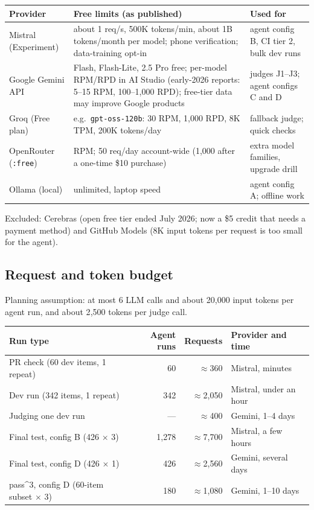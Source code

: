 \documentclass[11pt,a4paper]{article}
\newcommand{\code}[1]{\texttt{\small #1}}
\begin{document}
\begin{center}
\small
\begin{tabularx}{\linewidth}{@{}>{\raggedright\arraybackslash}p{2.3cm} >{\raggedright\arraybackslash}X >{\raggedright\arraybackslash}p{3.6cm}@{}}
\toprule
\textbf{Provider} & \textbf{Free limits (as published)} & \textbf{Used for}\\
\midrule
Mistral (Experiment) & about 1 req/s, 500K tokens/min, about 1B tokens/month per model; phone verification; data-training opt-in & agent config B, CI tier 2, bulk dev runs\\
Google Gemini API & Flash, Flash-Lite, 2.5 Pro free; per-model RPM/RPD in AI Studio (early-2026 reports: 5--15 RPM, 100--1{,}000 RPD); free-tier data may improve Google products & judges J1--J3; agent configs C and D\\
Groq (Free plan) & e.g.\ \code{gpt-oss-120b}: 30 RPM, 1{,}000 RPD, 8K TPM, 200K tokens/day & fallback judge; quick checks\\
OpenRouter (\code{:free}) & 20 RPM; 50 req/day account-wide (1{,}000 after a one-time \$10 purchase) & extra model families, upgrade drill\\
Ollama (local) & unlimited, laptop speed & agent config A; offline work\\
\bottomrule
\end{tabularx}
\end{center}

Excluded: Cerebras (open free tier ended July 2026; now a \$5 credit that needs a payment method)
and GitHub Models (8K input tokens per request is too small for the agent).

\subsection{Request and token budget}

Planning assumption: at most 6 LLM calls and about 20{,}000 input tokens per agent run, and about
2{,}500 tokens per judge call.

\begin{center}
\small
\begin{tabular}{@{}l r r l@{}}
\toprule
\textbf{Run type} & \textbf{Agent runs} & \textbf{Requests} & \textbf{Provider and time}\\
\midrule
PR check (60 dev items, 1 repeat) & 60 & $\approx$360 & Mistral, minutes\\
Dev run (342 items, 1 repeat) & 342 & $\approx$2{,}050 & Mistral, under an hour\\
Judging one dev run & --- & $\approx$400 & Gemini, 1--4 days\\
Final test, config B (426 $\times$ 3) & 1{,}278 & $\approx$7{,}700 & Mistral, a few hours\\
Final test, config D (426 $\times$ 1) & 426 & $\approx$2{,}560 & Gemini, several days\\
pass\^{}3, config D (60-item subset $\times$ 3) & 180 & $\approx$1{,}080 & Gemini, 1--10 days\\
\bottomrule
\end{tabular}
\end{center}
\end{document}
